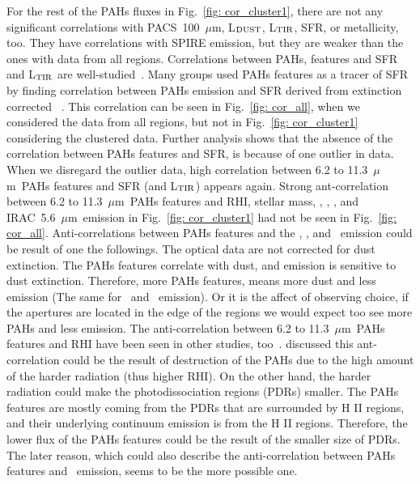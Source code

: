         For the rest of the PAHs fluxes in Fig.~\ref{fig: cor_cluster1}, there are not any significant correlations with PACS~100~$\mu$m, L$_{\rm DUST}$, L$_{\rm TIR}$, SFR, or metallicity, too.
        They have correlations with SPIRE emission, but they are weaker than the ones with data from all regions.
        Correlations between PAHs, features and SFR and L$_{\rm TIR}$  are well-studied~\citep[e.g.][]{Tielens08,Peeters04}. 
        Many groups used PAHs features as a tracer of SFR by finding correlation between 
        PAHs emission and SFR derived from extinction corrected \halpha~\citep[e.g.][]{Shipley16,Khramtsova13,Calzetti07}.
        This correlation can be seen in Fig.~\ref{fig: cor_all}, when we considered the data from all regions, but not in Fig.~\ref{fig: cor_cluster1} considering the clustered data.
        Further analysis shows that the absence of the correlation between PAHs features and SFR, is because of one outlier in data. 
        When we disregard the outlier data, high correlation between 6.2 to 11.3~$\mu$m~PAHs features and SFR (and L$_{\rm TIR}$) appears again.
        Strong ant-correlation between 6.2 to 11.3~$\mu$m~PAHs features and RHI, stellar mass, \halpha, \sii, \oiii, and IRAC~5.6~$\mu$m~emission in Fig.~\ref{fig: cor_cluster1} had not be seen in Fig.~\ref{fig: cor_all}.
        Anti-correlations between PAHs features and the \halpha, \sii, and \oiii~emission could be result of one the followings. 
        The optical data are not corrected for dust extinction. The PAHs features correlate with dust, and \halpha emission is sensitive to dust extinction. Therefore, more PAHs features, means more dust and less \halpha emission (The same for \sii~and \Oiii~emission).
        Or it is the affect of observing choice, if the apertures are located in the edge of the regions we would expect too see more PAHs and less \halpha emission. %
        The anti-correlation between 6.2 to 11.3~$\mu$m~PAHs features and RHI have been seen in other studies, too~\citep[e.g.][]{Dim15, Gordon08, Wu06}.
        \cite{Wu06} discussed this ant-correlation could be the result of destruction of the PAHs due to the high amount of the harder radiation (thus higher RHI).
        On the other hand, \cite{Gordon08} the harder radiation could make the photodissociation regions (PDRs) smaller.
        The PAHs features are mostly coming from the PDRs that are surrounded by H {\sc II} regions, and their underlying continuum emission is from the H {\sc II} regions.
        Therefore, the lower flux of the PAHs features could be the result of the smaller size of PDRs.
        The later reason, which could also describe the anti-correlation between PAHs features and \halpha~emission, seems to be the more possible one. 
        
